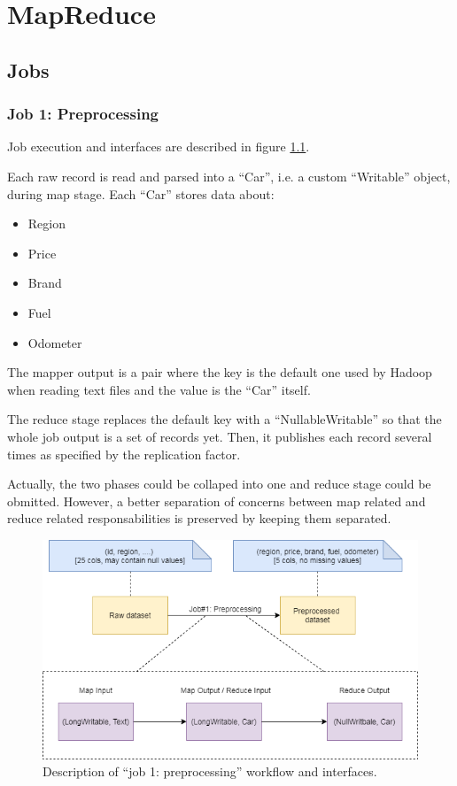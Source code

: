 \chapter{MapReduce}

\section{Jobs}

\subsection{Job 1: Preprocessing}

Job execution and interfaces are described in figure \ref{fig:MR-job-1}.
 
Each raw record is read and parsed into a ``Car'', i.e. a custom ``Writable'' object, during map stage. 
Each ``Car'' stores data about:
\begin{itemize}
 \item Region
 \item Price
 \item Brand
 \item Fuel
 \item Odometer
\end{itemize}

The mapper output is a pair where the key is the default one used by Hadoop when reading text files and the value is the ``Car'' itself.

The reduce stage replaces the default key with a ``NullableWritable'' so that the whole job output is a set of records yet. Then, it publishes each record several times as specified by the replication factor.

Actually, the two phases could be collaped into one and reduce stage could be obmitted. However, a better separation of concerns between map related and reduce related responsabilities is preserved by keeping them separated.

\begin{figure}[H]
	\centering
	\includegraphics[scale=0.7]{images/2-mapreduce/MR-job-1.png}
	\caption{Description of ``job 1: preprocessing'' workflow and interfaces.}
	\label{fig:MR-job-1}
\end{figure}

